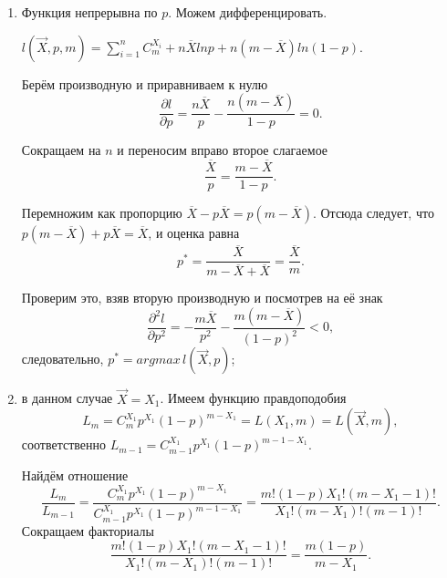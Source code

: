 \begin{enumerate}[label=\alph*)]
  \item Функция непрерывна по $p$.
  Можем дифференцировать.

  $l \left( \vec{X}, p, m \right) =
    \sum \limits_{i = 1}^n C_m^{X_i} +
    n \overline{X} ln p +
    n \left( m - \overline{X} \right) ln \left( 1 - p \right) $.

  Берём производную и приравниваем к нулю
  $$ \frac{ \partial l}{ \partial p} =
    \frac{n \overline{X}}{p} - \frac{n \left( m - \overline{X} \right) }{1 - p} = 0.$$

  Сокращаем на $n$ и переносим вправо второе слагаемое
  $$ \frac{ \overline{X}}{p} =
    \frac{m - \overline{X}}{1 - p}.$$

  Перемножим как пропорцию $ \overline{X} - p \overline{X} = p \left( m - \overline{X} \right) $.
  Отсюда следует, что $p \left( m - \overline{X} \right) + p \overline{X} = \overline{X}$,
  и оценка равна
  $$p^* =
    \frac{ \overline{X}}{m - \overline{X} + \overline{X}} =
    \frac{ \overline{X}}{m}.$$

  Проверим это, взяв вторую производную и посмотрев на её знак
  $$ \frac{ \partial^2 l}{ \partial p^2} =
    - \frac{m \overline{X}}{p^2} -
    \frac{m \left( m - \overline{X} \right) }{ \left( 1 - p \right)^2} <
    0,$$
  следовательно, $p^* = argmax \, l \left( \vec{X}, p \right) $;
  \item в данном случае $ \vec{X} = X_1$.
  Имеем функцию правдоподобия
  $$L_m =
    C_m^{X_1} p^{X_1} \left( 1 - p \right)^{m - X_1} =
    L \left( X_1, m \right) =
    L \left( \vec{X}, m \right),$$
  соответственно $L_{m - 1} = C_{m - 1}^{X_1} p^{X_1} \left( 1 - p \right)^{m - 1 - X_1}$.

  Найдём отношение
  $$ \frac{L_m}{L_{m - 1}} =
    \frac{C_m^{X_1} p^{X_1} \left( 1 - p \right)^{m - X_1}}{C_{m - 1}^{X_1} p^{X_1} \left( 1 - p \right)^{m - 1 - X_1}} =
    \frac{m! \left( 1 - p \right) X_1 ! \left( m - X_1 - 1 \right)!}{X_1 ! \left( m - X_1 \right)! \left( m - 1 \right)!}.$$
  Сокращаем факториалы
  $$ \frac{m! \left( 1 - p \right) X_1 ! \left( m - X_1 - 1 \right)!}{X_1 ! \left( m - X_1 \right)! \left( m - 1 \right)!} =
    \frac{m \left( 1 - p \right) }{m - X_1}.$$


\end{enumerate}
